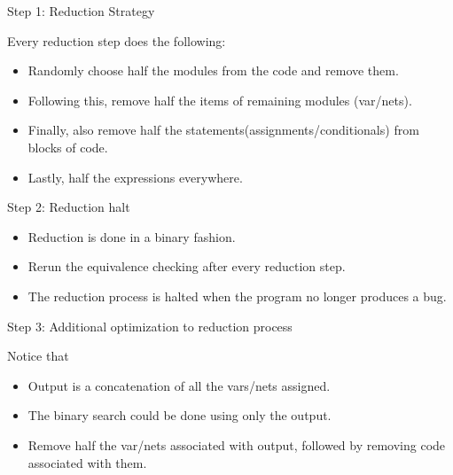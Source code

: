 \documentclass[xcolor=dvipsnames]{beamer}
\begin{document}
    \begin{frame}{Step 1: Reduction Strategy}

        Every reduction step does the following:
        \begin{itemize}
            \item Randomly choose half the modules from the code and remove them. 
            \item Following this, remove half the items of remaining modules (var/nets).
            \item Finally, also remove half the statements(assignments/conditionals) from blocks of code.
            \item Lastly, half the expressions everywhere.
        \end{itemize}

    \end{frame}

    \begin{frame}{Step 2: Reduction halt}

        \begin{itemize}
            \item Reduction is done in a binary fashion. 
            \item Rerun the equivalence checking after every reduction step.
            \item The reduction process is halted when the program no longer produces a bug.
        \end{itemize}
        
    \end{frame}

    \begin{frame}{Step 3: Additional optimization to reduction process}

        Notice that
        \begin{itemize}
            \item Output is a concatenation of all the vars/nets assigned. 
            \item The binary search could be done using only the output. 
            \item Remove half the var/nets associated with output, followed by removing code associated with them. 
        \end{itemize}
        
    \end{frame}
\end{document}

